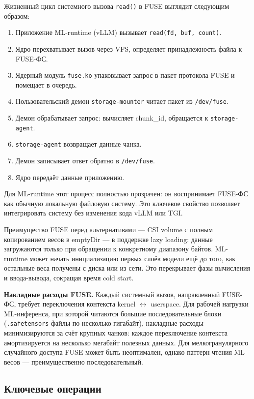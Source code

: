 Жизненный цикл системного вызова \texttt{read()} в FUSE выглядит следующим образом:
\begin{enumerate}[leftmargin=*]
  \item Приложение ML-runtime (vLLM) вызывает \texttt{read(fd, buf, count)}.
  \item Ядро перехватывает вызов через VFS, определяет принадлежность файла к FUSE-ФС.
  \item Ядерный модуль \texttt{fuse.ko} упаковывает запрос в пакет протокола FUSE и помещает в очередь.
  \item Пользовательский демон \texttt{storage-mounter} читает пакет из \texttt{/dev/fuse}.
  \item Демон обрабатывает запрос: вычисляет chunk\_id, обращается к \texttt{storage-agent}.
  \item \texttt{storage-agent} возвращает данные чанка.
  \item Демон записывает ответ обратно в \texttt{/dev/fuse}.
  \item Ядро передаёт данные приложению.
\end{enumerate}

Для ML-runtime этот процесс полностью прозрачен: он воспринимает FUSE-ФС как обычную локальную файловую систему. Это ключевое свойство позволяет интегрировать систему без изменения кода vLLM или TGI.

Преимущество FUSE перед альтернативами --- CSI volume с полным копированием весов в emptyDir --- в поддержке lazy loading: данные загружаются только при обращении к конкретному диапазону байтов. ML-runtime может начать инициализацию первых слоёв модели ещё до того, как остальные веса получены с диска или из сети. Это перекрывает фазы вычисления и ввода-вывода, сокращая время cold start.

\textbf{Накладные расходы FUSE.} Каждый системный вызов, направленный FUSE-ФС, требует переключения контекста kernel $\leftrightarrow$ userspace. Для рабочей нагрузки ML-инференса, при которой читаются большие последовательные блоки (\texttt{.safetensors}-файлы по несколько гигабайт), накладные расходы минимизируются за счёт крупных чанков: каждое переключение контекста амортизируется на несколько мегабайт полезных данных. Для мелкогранулярного случайного доступа FUSE может быть неоптимален, однако паттерн чтения ML-весов --- преимущественно последовательный.

\subsection*{Ключевые операции}

